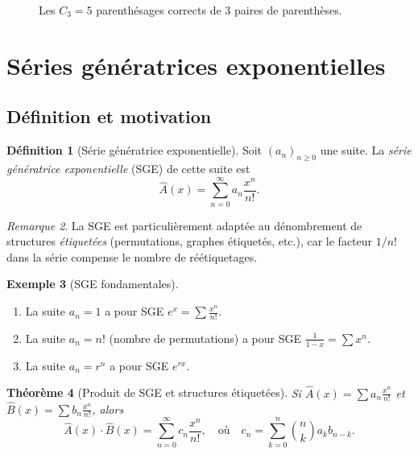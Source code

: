 \documentclass[12pt,a4paper,openany]{book}
\theoremstyle{definition}
\newtheorem{definition}{Définition}[chapter]
\newtheorem{exemple}[definition]{Exemple}
\theoremstyle{plain}
\newtheorem{theoreme}[definition]{Théorème}
\theoremstyle{remark}
\newtheorem{remarque}[definition]{Remarque}
\begin{document}
\begin{figure}[ht]
\centering
{}
\caption{Les $C_3 = 5$ parenthésages corrects de $3$ paires de parenthèses.}
\label{fig:parenthesages}
\end{figure}

\section{Séries génératrices exponentielles}
\label{sec:egf}

\subsection{Définition et motivation}

\begin{definition}[Série génératrice exponentielle]
\label{def:egf}
Soit $(a_n)_{n \geqslant 0}$ une suite. La \emph{série génératrice
exponentielle} (SGE) de cette suite est
\[
  \hat{A}(x) = \sum_{n=0}^{\infty} a_n \frac{x^n}{n!}.
\]
\end{definition}

\begin{remarque}
\label{rem:egf-motivation}
La SGE est particulièrement adaptée au dénombrement de structures
\emph{étiquetées} (permutations, graphes étiquetés, etc.), car le facteur
$1/n!$ dans la série compense le nombre de réétiquetages.
\end{remarque}

\begin{exemple}[SGE fondamentales]
\label{ex:egf-fondamentales}
\begin{enumerate}[label=\roman*)]
  \item La suite $a_n = 1$ a pour SGE $e^x = \sum \frac{x^n}{n!}$.
  \item La suite $a_n = n!$ (nombre de permutations) a pour SGE
    $\frac{1}{1-x} = \sum x^n$.
  \item La suite $a_n = r^n$ a pour SGE $e^{rx}$.
\end{enumerate}
\end{exemple}

\begin{theoreme}[Produit de SGE et structures étiquetées]
\label{thm:egf-produit}
Si $\hat{A}(x) = \sum a_n \frac{x^n}{n!}$ et $\hat{B}(x) = \sum b_n \frac{x^n}{n!}$,
alors
\[
  \hat{A}(x) \cdot \hat{B}(x) = \sum_{n=0}^{\infty} c_n \frac{x^n}{n!},
  \quad \text{où} \quad
  c_n = \sum_{k=0}^{n} \binom{n}{k} a_k b_{n-k}.
\]
\end{theoreme}
\end{document}
